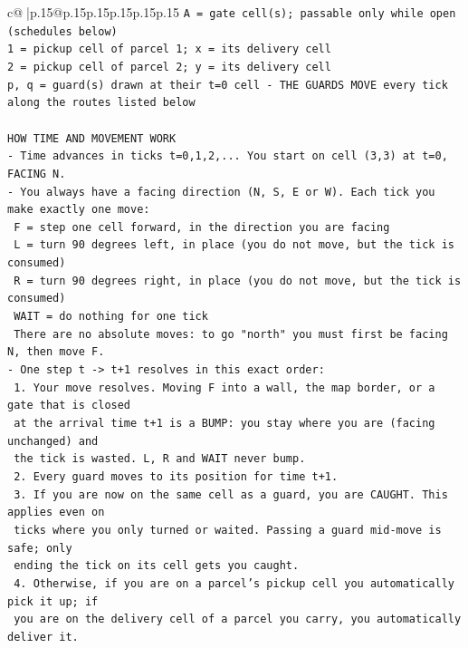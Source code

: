 \documentclass{article}
\begin{document}
{\begin{supertabular}{c@{$\;$}|p{.15\linewidth}@{}p{.15\linewidth}p{.15\linewidth}p{.15\linewidth}p{.15\linewidth}p{.15\linewidth}}
{{{\texttt{A = gate cell(s); passable only while open (schedules below)} \\
\texttt{1 = pickup cell of parcel 1; x = its delivery cell} \\
\texttt{2 = pickup cell of parcel 2; y = its delivery cell} \\
\texttt{p, q = guard(s) drawn at their t=0 cell {-} THE GUARDS MOVE every tick along the routes listed below} \\
\\ 
\texttt{HOW TIME AND MOVEMENT WORK} \\
\texttt{{-} Time advances in ticks t=0,1,2,... You start on cell (3,3) at t=0, FACING N.} \\
\texttt{{-} You always have a facing direction (N, S, E or W). Each tick you make exactly one move:} \\
\texttt{  F    = step one cell forward, in the direction you are facing} \\
\texttt{  L    = turn 90 degrees left, in place (you do not move, but the tick is consumed)} \\
\texttt{  R    = turn 90 degrees right, in place (you do not move, but the tick is consumed)} \\
\texttt{  WAIT = do nothing for one tick} \\
\texttt{  There are no absolute moves: to go "north" you must first be facing N, then move F.} \\
\texttt{{-} One step t {-}> t+1 resolves in this exact order:} \\
\texttt{  1. Your move resolves. Moving F into a wall, the map border, or a gate that is closed} \\
\texttt{     at the arrival time t+1 is a BUMP: you stay where you are (facing unchanged) and} \\
\texttt{     the tick is wasted. L, R and WAIT never bump.} \\
\texttt{  2. Every guard moves to its position for time t+1.} \\
\texttt{  3. If you are now on the same cell as a guard, you are CAUGHT. This applies even on} \\
\texttt{     ticks where you only turned or waited. Passing a guard mid{-}move is safe; only} \\
\texttt{     ending the tick on its cell gets you caught.} \\
\texttt{  4. Otherwise, if you are on a parcel's pickup cell you automatically pick it up; if} \\
\texttt{     you are on the delivery cell of a parcel you carry, you automatically deliver it.} \\
}}}
\end{supertabular}}
\end{document}
